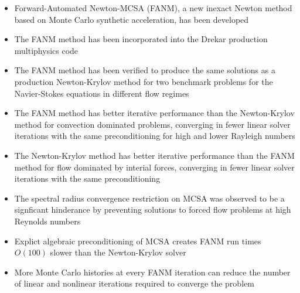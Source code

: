 \begin{itemize}
\item Forward-Automated Newton-MCSA (FANM), a new inexact Newton
  method based on Monte Carlo synthetic acceleration, has been
  developed
\item The FANM method has been incorporated into the Drekar production
  multiphysics code
\item The FANM method has been verified to produce the same solutions
  as a production Newton-Krylov method for two benchmark problems for
  the Navier-Stokes equations in different flow regimes
\item The FANM method has better iterative performance than the
  Newton-Krylov method for convection dominated problems, converging
  in fewer linear solver iterations with the same preconditioning for
  high and lower Rayleigh numbers
\item The Newton-Krylov method has better iterative performance than
  the FANM method for flow dominated by interial forces, converging in
  fewer linear solver iterations with the same preconditioning
\item The spectral radius convergence restriction on MCSA was observed
  to be a signficant hinderance by preventing solutions to forced flow
  problems at high Reynolds numbers
\item Explict algebraic preconditioning of MCSA creates FANM run times
  $O(100)$ slower than the Newton-Krylov solver
\item More Monte Carlo histories at every FANM iteration can reduce
  the number of linear and nonlinear iterations required to converge
  the problem
\end{itemize}
